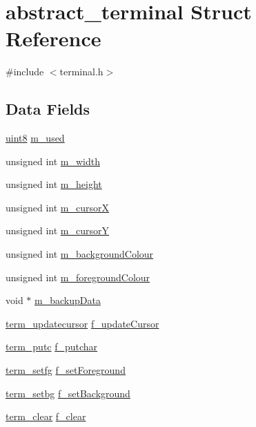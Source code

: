 \hypertarget{structabstract__terminal}{
\section{abstract\_\-terminal Struct Reference}
\label{structabstract__terminal}
}


{\ttfamily \#include $<$terminal.h$>$}

\subsection*{Data Fields}
\begin{DoxyCompactItemize}
\item 
\hyperlink{int__types_8h_adde6aaee8457bee49c2a92621fe22b79}{uint8} \hyperlink{structabstract__terminal_ab81c5c6dd91d663e1827deaa52aa3338}{m\_\-used}
\item 
unsigned int \hyperlink{structabstract__terminal_a164ec0d15d6e0880f0874e060b3b189f}{m\_\-width}
\item 
unsigned int \hyperlink{structabstract__terminal_a9935a044824cab7418302383c18dc4cc}{m\_\-height}
\item 
unsigned int \hyperlink{structabstract__terminal_a02223703fe96837799ccc082b0fcc391}{m\_\-cursorX}
\item 
unsigned int \hyperlink{structabstract__terminal_a393f6460c238ee68e5ff87e84ed32cad}{m\_\-cursorY}
\item 
unsigned int \hyperlink{structabstract__terminal_a1ff90f4c00bf5d9b438ca6709a2ecdfc}{m\_\-backgroundColour}
\item 
unsigned int \hyperlink{structabstract__terminal_a6767b94d1079244c4555f7addd647b16}{m\_\-foregroundColour}
\item 
void $\ast$ \hyperlink{structabstract__terminal_a57610561db71a58777d226a2016fe1a1}{m\_\-backupData}
\item 
\hyperlink{terminal_8h_a6bccfe4a48fc500d6b6c0e18205ca867}{term\_\-updatecursor} \hyperlink{structabstract__terminal_a730a4834d172b670d418603857e5bb75}{f\_\-updateCursor}
\item 
\hyperlink{terminal_8h_a9090c5151fee9a12c9bd850f32c232da}{term\_\-putc} \hyperlink{structabstract__terminal_ae20f5f7f2622c07f12b889c0c9082826}{f\_\-putchar}
\item 
\hyperlink{terminal_8h_a03b02cb5633f9e87b0546ab6a96497ae}{term\_\-setfg} \hyperlink{structabstract__terminal_ad23d8fe1e792c8c66abc9d8231e97e27}{f\_\-setForeground}
\item 
\hyperlink{terminal_8h_a3ee379a2f79f841149100ad1fe952fd9}{term\_\-setbg} \hyperlink{structabstract__terminal_a5b7c2b270c674339ed184412a2bfb89e}{f\_\-setBackground}
\item 
\hyperlink{terminal_8h_a290c20f21648df272685de95bcc2dd3b}{term\_\-clear} \hyperlink{structabstract__terminal_a2b630ff0477104ec3a84324f5de89248}{f\_\-clear}
\end{DoxyCompactItemize}



